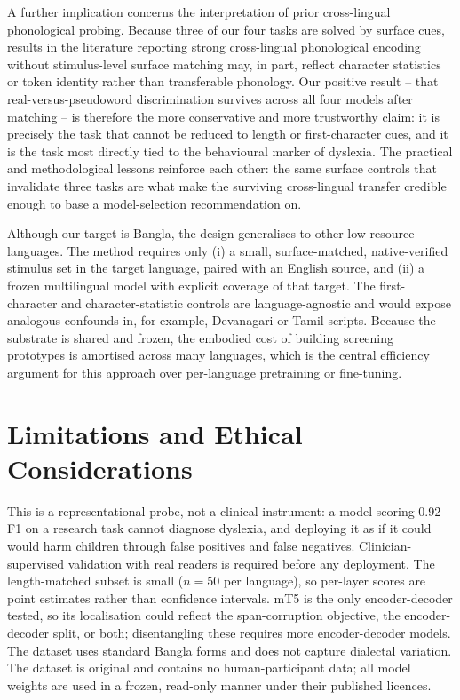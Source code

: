 \documentclass[conference]{IEEEtran}
\begin{document}
A further implication concerns the interpretation of prior cross-lingual phonological probing. Because three of our four tasks are solved by surface cues, results in the literature reporting strong cross-lingual phonological encoding without stimulus-level surface matching may, in part, reflect character statistics or token identity rather than transferable phonology. Our positive result -- that real-versus-pseudoword discrimination survives across all four models after matching -- is therefore the more conservative and more trustworthy claim: it is precisely the task that cannot be reduced to length or first-character cues, and it is the task most directly tied to the behavioural marker of dyslexia. The practical and methodological lessons reinforce each other: the same surface controls that invalidate three tasks are what make the surviving cross-lingual transfer credible enough to base a model-selection recommendation on.

Although our target is Bangla, the design generalises to other low-resource languages. The method requires only (i) a small, surface-matched, native-verified stimulus set in the target language, paired with an English source, and (ii) a frozen multilingual model with explicit coverage of that target. The first-character and character-statistic controls are language-agnostic and would expose analogous confounds in, for example, Devanagari or Tamil scripts. Because the substrate is shared and frozen, the embodied cost of building screening prototypes is amortised across many languages, which is the central efficiency argument for this approach over per-language pretraining or fine-tuning.

\section{Limitations and Ethical Considerations}
This is a representational probe, not a clinical instrument: a model scoring 0.92 F1 on a research task cannot diagnose dyslexia, and deploying it as if it could would harm children through false positives and false negatives. Clinician-supervised validation with real readers is required before any deployment. The length-matched subset is small ($n=50$ per language), so per-layer scores are point estimates rather than confidence intervals. mT5 is the only encoder-decoder tested, so its localisation could reflect the span-corruption objective, the encoder-decoder split, or both; disentangling these requires more encoder-decoder models. The dataset uses standard Bangla forms and does not capture dialectal variation. The dataset is original and contains no human-participant data; all model weights are used in a frozen, read-only manner under their published licences.
\end{document}
